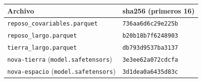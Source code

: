 \begin{tabular}{ll}\toprule
 Archivo & sha256 (primeros 16) \\
\midrule
\texttt{reposo\_covariables.parquet} & \texttt{736aa6d6c29e225b} \\
\texttt{reposo\_largo.parquet} & \texttt{b20b18b7f6248903} \\
\texttt{tierra\_largo.parquet} & \texttt{db793d9537ba3137} \\
\texttt{nova-tierra} (\texttt{model.safetensors}) & \texttt{3e3ee62a072cdcfa} \\
\texttt{nova-espacio} (\texttt{model.safetensors}) & \texttt{3d1dea0a6435d83c} \\
\bottomrule\end{tabular}
